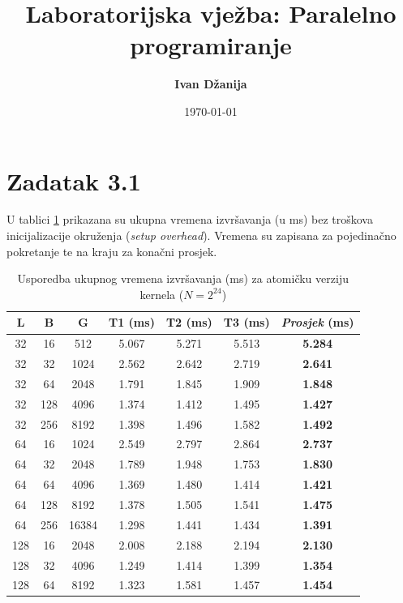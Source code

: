 \documentclass[12pt,a4paper]{article}
\begin{document}
\title{\textbf{Laboratorijska vježba: Paralelno programiranje}}
\author{\textbf{Ivan Džanija}}
\date{\today}

\maketitle
\tableofcontents
\newpage

\section{Zadatak 3.1}
U tablici \ref{tab:rezultati} prikazana su ukupna vremena izvršavanja
(u ms) bez troškova inicijalizacije okruženja (\textit{setup overhead}).
Vremena su zapisana za pojedinačno pokretanje te na kraju za konačni
prosjek.

\begin{table}[h!]
\centering
\caption{Usporedba ukupnog vremena izvršavanja (ms)
  za atomičku verziju kernela ($N = 2^{24}$)}
\label{tab:rezultati}
\vspace{0.3cm}
\begin{tabular}{ccccccc}
\toprule
  \textbf{L} & \textbf{B} & \textbf{G} & \textbf{T1 (ms)} &
  \textbf{T2 (ms)} & \textbf{T3 (ms)} &
  \textbf{\textit{Prosjek} (ms)} \\
\midrule
32  & 16  & 512   & 5.067 & 5.271 & 5.513 & \textbf{5.284} \\
32  & 32  & 1024  & 2.562 & 2.642 & 2.719 & \textbf{2.641} \\
32  & 64  & 2048  & 1.791 & 1.845 & 1.909 & \textbf{1.848} \\
32  & 128 & 4096  & 1.374 & 1.412 & 1.495 & \textbf{1.427} \\
32  & 256 & 8192  & 1.398 & 1.496 & 1.582 & \textbf{1.492} \\
\midrule
64  & 16  & 1024  & 2.549 & 2.797 & 2.864 & \textbf{2.737} \\
64  & 32  & 2048  & 1.789 & 1.948 & 1.753 & \textbf{1.830} \\
64  & 64  & 4096  & 1.369 & 1.480 & 1.414 & \textbf{1.421} \\
64  & 128 & 8192  & 1.378 & 1.505 & 1.541 & \textbf{1.475} \\
64  & 256 & 16384 & 1.298 & 1.441 & 1.434 & \textbf{1.391} \\
\midrule
128 & 16  & 2048  & 2.008 & 2.188 & 2.194 & \textbf{2.130} \\
128 & 32  & 4096  & 1.249 & 1.414 & 1.399 & \textbf{1.354} \\
128 & 64  & 8192  & 1.323 & 1.581 & 1.457 & \textbf{1.454} \\

\end{tabular}
\end{table}
\end{document}
